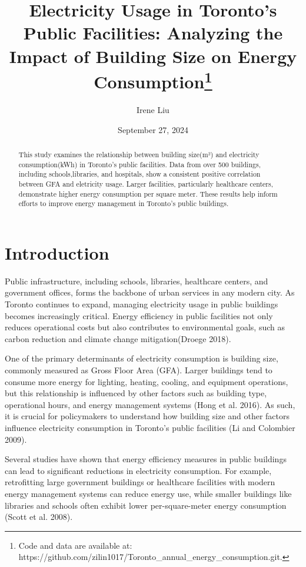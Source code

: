 \documentclass[
  letterpaper,
  DIV=11,
  numbers=noendperiod]{scrartcl}
\title{Electricity Usage in Toronto's Public Facilities: Analyzing the
Impact of Building Size on Energy Consumption\thanks{Code and data are
available at:
https://github.com/zilin1017/Toronto\_annual\_energy\_consumption.git.}}
\author{Irene Liu}
\date{September 27, 2024}
\renewcommand*\contentsname{Table of contents}
\newcommand\contentsname{Table of contents}
\begin{document}
\maketitle
\begin{abstract}
This study examines the relationship between building size(m²) and
electricity consumption(kWh) in Toronto's public facilities. Data from
over 500 buildings, including schools,libraries, and hospitals, show a
consistent positive correlation between GFA and eletricity usage. Larger
facilities, particularly healthcare centers, demonstrate higher energy
consumption per square meter. These results help inform efforts to
improve energy management in Toronto's public buildings.
\end{abstract}

\renewcommand*\contentsname{Table of contents}
{
\hypersetup{linkcolor=}
\setcounter{tocdepth}{3}
\tableofcontents
}

\section{Introduction}\label{introduction}

Public infrastructure, including schools, libraries, healthcare centers,
and government offices, forms the backbone of urban services in any
modern city. As Toronto continues to expand, managing electricity usage
in public buildings becomes increasingly critical. Energy efficiency in
public facilities not only reduces operational costs but also
contributes to environmental goals, such as carbon reduction and climate
change mitigation(Droege 2018).

One of the primary determinants of electricity consumption is building
size, commonly measured as Gross Floor Area (GFA). Larger buildings tend
to consume more energy for lighting, heating, cooling, and equipment
operations, but this relationship is influenced by other factors such as
building type, operational hours, and energy management systems (Hong et
al. 2016). As such, it is crucial for policymakers to understand how
building size and other factors influence electricity consumption in
Toronto's public facilities (Li and Colombier 2009).

Several studies have shown that energy efficiency measures in public
buildings can lead to significant reductions in electricity consumption.
For example, retrofitting large government buildings or healthcare
facilities with modern energy management systems can reduce energy use,
while smaller buildings like libraries and schools often exhibit lower
per-square-meter energy consumption (Scott et al. 2008).
\end{document}
